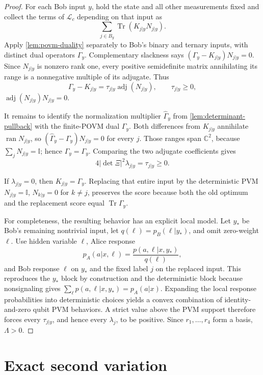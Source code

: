 \documentclass[11pt]{article}
\theoremstyle{definition}
\newcommand{\Tr}{\operatorname{Tr}}
\newcommand{\id}{\mathbb I}
\newcommand{\C}{\mathbb C}
\begin{document}
\begin{proof}
For each Bob input \(y\), hold the state and all other measurements fixed and
collect the terms of \(\mathcal L_c\) depending on that input as
\[
\sum_{j\in B_y}\Tr(K_{j|y}N_{j|y}).
\]
Apply \cref{lem:povm-duality} separately to Bob's binary and ternary inputs,
with distinct dual operators \(\Gamma_y\). Complementary slackness says
\((\Gamma_y-K_{j|y})N_{j|y}=0\). Since \(N_{j|y}\) is nonzero rank one, every
positive semidefinite matrix annihilating its range is a nonnegative multiple
of its adjugate. Thus
\[
\Gamma_y-K_{j|y}
=\tau_{j|y}\operatorname{adj}(N_{j|y}),\qquad \tau_{j|y}\ge0,
\]
\(\operatorname{adj}(N_{j|y})N_{j|y}=0\).

It remains to identify the normalization multiplier
\(\widehat\Gamma_y\) from \cref{lem:determinant-pullback} with the finite-POVM
dual \(\Gamma_y\). Both differences from \(K_{j|y}\) annihilate
\(\operatorname{ran}N_{j|y}\), so
\((\widehat\Gamma_y-\Gamma_y)N_{j|y}=0\) for every \(j\). Those ranges span
\(\C^2\), because \(\sum_jN_{j|y}=\id\); hence
\(\widehat\Gamma_y=\Gamma_y\). Comparing the two adjugate coefficients gives
\[
4|\det\Xi|^2\lambda_{j|y}=\tau_{j|y}\ge0.
\]

If \(\lambda_{j|y}=0\), then \(K_{j|y}=\Gamma_y\). Replacing that entire input
by the deterministic PVM \(N_{j|y}=\id\), \(N_{k|y}=0\) for \(k\ne j\),
preserves the score because both the old optimum and the replacement score
equal \(\Tr\Gamma_y\).

For completeness, the resulting behavior has an explicit local model. Let
\(y_*\) be Bob's remaining nontrivial input, let
\(q(\ell)=p_B(\ell|y_*)\), and omit zero-weight \(\ell\). Use hidden variable
\(\ell\), Alice response
\[
p_A(a|x,\ell)=\frac{p(a,\ell|x,y_*)}{q(\ell)},
\]
and Bob response \(\ell\) on \(y_*\) and the fixed label \(j\) on the replaced
input. This reproduces the \(y_*\) block by construction and the deterministic
block because nonsignaling gives
\(\sum_\ell p(a,\ell|x,y_*)=p_A(a|x)\). Expanding the local response
probabilities into deterministic choices yields a convex combination of
identity-and-zero qubit PVM behaviors. A strict value above the PVM support
therefore forces every \(\tau_{j|y}\), and hence every \(\lambda_j\), to be
positive. Since \(r_1,\ldots,r_4\) form a basis, \(\Lambda>0\).
\end{proof}

\section{Exact second variation}
\label{sec:second-variation}
\end{document}
